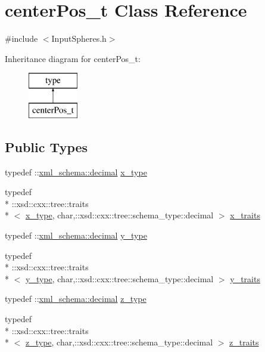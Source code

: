 \hypertarget{classcenterPos__t}{\section{center\-Pos\-\_\-t Class Reference}
\label{classcenterPos__t}
}


{\ttfamily \#include $<$Input\-Spheres.\-h$>$}

Inheritance diagram for center\-Pos\-\_\-t\-:\begin{figure}[H]
\begin{center}
\leavevmode
\includegraphics[height=2.000000cm]{classcenterPos__t}
\end{center}
\end{figure}
\subsection*{Public Types}
\begin{DoxyCompactItemize}
\item 
typedef \-::\hyperlink{namespacexml__schema_a69bfaf24f63a8c18ebd8e21db6b343df}{xml\-\_\-schema\-::decimal} \hyperlink{classcenterPos__t_ad9202ab9a64d0ac44ac212e2b8ad52f9}{x\-\_\-type}
\item 
typedef \\*
\-::xsd\-::cxx\-::tree\-::traits\\*
$<$ \hyperlink{classcenterPos__t_ad9202ab9a64d0ac44ac212e2b8ad52f9}{x\-\_\-type}, char,\-::xsd\-::cxx\-::tree\-::schema\-\_\-type\-::decimal $>$ \hyperlink{classcenterPos__t_ab983e22a2d65a5fd634f53910e7ee483}{x\-\_\-traits}
\item 
typedef \-::\hyperlink{namespacexml__schema_a69bfaf24f63a8c18ebd8e21db6b343df}{xml\-\_\-schema\-::decimal} \hyperlink{classcenterPos__t_a729ec04aac9d1066004b319cca2879fd}{y\-\_\-type}
\item 
typedef \\*
\-::xsd\-::cxx\-::tree\-::traits\\*
$<$ \hyperlink{classcenterPos__t_a729ec04aac9d1066004b319cca2879fd}{y\-\_\-type}, char,\-::xsd\-::cxx\-::tree\-::schema\-\_\-type\-::decimal $>$ \hyperlink{classcenterPos__t_a3a852dc42bb49f7aba36332b422e9430}{y\-\_\-traits}
\item 
typedef \-::\hyperlink{namespacexml__schema_a69bfaf24f63a8c18ebd8e21db6b343df}{xml\-\_\-schema\-::decimal} \hyperlink{classcenterPos__t_a6c424433a912263b9c8644a89ad14082}{z\-\_\-type}
\item 
typedef \\*
\-::xsd\-::cxx\-::tree\-::traits\\*
$<$ \hyperlink{classcenterPos__t_a6c424433a912263b9c8644a89ad14082}{z\-\_\-type}, char,\-::xsd\-::cxx\-::tree\-::schema\-\_\-type\-::decimal $>$ \hyperlink{classcenterPos__t_a4dd2aec563bb681d33444f495887ebb8}{z\-\_\-traits}
\end{DoxyCompactItemize}
